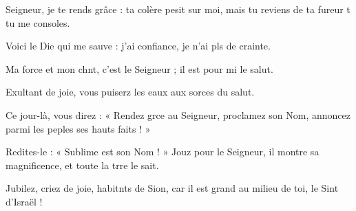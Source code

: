 \item Seigneur, je te rends grâce :\pscross{} ta colère pesit sur moi,\psstar{} mais tu reviens de ta fureur t tu me consoles.
\item Voici le Die qui me sauve :\psstar{} j’ai confiance, je n’ai pls de crainte.
\item Ma force et mon chnt, c’est le Seigneur ;\psstar{} il est pour mi le salut.
\item Exultant de joie, vous puiserz les eaux\psstar{} aux sorces du salut.
\item Ce jour-là, vous direz : « Rendez grce au Seigneur,\psstar{} proclamez son Nom, annoncez parmi les peples ses hauts faits ! »
\item Redites-le : « Sublime est son Nom ! »\pscross{} Jouz pour le Seigneur,\psstar{} il montre sa magnificence, et toute la trre le sait.
\item Jubilez, criez de joie, habitnts de Sion,\psstar{} car il est grand au milieu de toi, le Sint d’Israël !